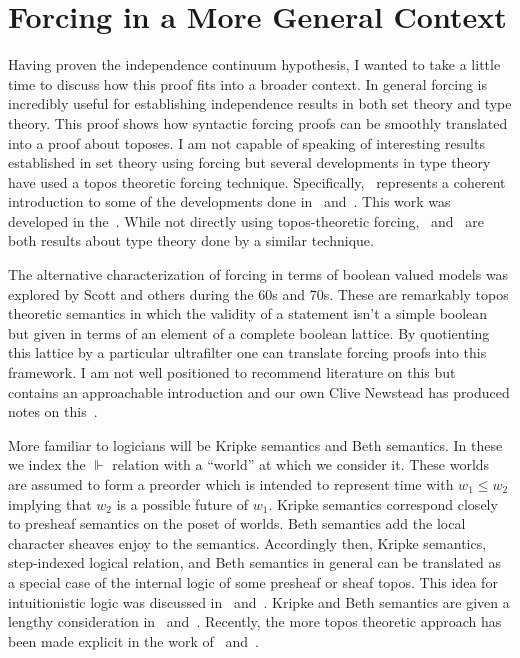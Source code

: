 \section{Forcing in a More General Context}\label{sec:conclusion}

Having proven the independence continuum hypothesis, I wanted to take
a little time to discuss how this proof fits into a broader
context. In general forcing is incredibly useful for establishing
independence results in both set theory and type theory. This proof
shows how syntactic forcing proofs can be smoothly translated into a
proof about toposes. I am not capable of speaking of interesting
results established in set theory using forcing but several
developments in type theory have used a topos theoretic forcing
technique. Specifically,~\citet{Coquand:12} represents a coherent
introduction to some of the developments done in~\citet{Coquand:04}
and~\citet{Coquand:16}. This work was developed in
the~\citet{Jaber:14}. While not directly using topos-theoretic
forcing,~\citet{Escardo:13} and~\citet{Sterling:16} are both results
about type theory done by a similar technique.

The alternative characterization of forcing in terms of boolean valued
models was explored by Scott and others during the 60s and 70s. These
are remarkably topos theoretic semantics in which the validity of a
statement isn't a simple boolean but given in terms of an element of a
complete boolean lattice. By quotienting this lattice by a particular
ultrafilter one can translate forcing proofs into this framework. I am
not well positioned to recommend literature on this
but~\citet{Jech:08} contains an approachable introduction and our own
Clive Newstead has produced notes on this~\cite{Newstead:12}.

More familiar to logicians will be Kripke semantics and Beth
semantics. In these we index the $\Vdash$ relation with a ``world'' at
which we consider it. These worlds are assumed to form a preorder
which is intended to represent time with $w_1 \le w_2$ implying that
$w_2$ is a possible future of $w_1$. Kripke semantics correspond
closely to presheaf semantics on the poset of worlds. Beth semantics
add the local character sheaves enjoy to the semantics. Accordingly
then, Kripke semantics, step-indexed logical relation, and Beth
semantics in general can be translated as a special case of the
internal logic of some presheaf or sheaf topos. This idea for
intuitionistic logic was discussed in~\citet{Fourman:82}
and~\citet{Fourman:13}. Kripke and Beth semantics are given a lengthy
consideration in~\citet{Dummett:00}
and~\citet{Troelstra:88}. Recently, the more topos theoretic approach
has been made explicit in the work of~\citet{Birkedal:11}
and~\citet{Dreyer:09}.

